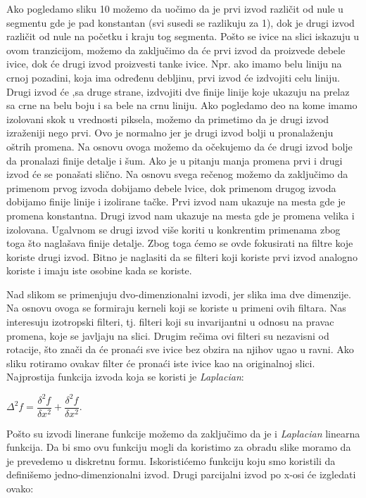 \documentclass[a4paper,12pt,titlepage]{article}
\begin{document}
Ako pogledamo sliku 10 možemo da uočimo da je prvi izvod različit od nule u segmentu gde je pad konstantan (svi susedi se razlikuju za 1), dok je drugi izvod različit od nule na početku i kraju tog segmenta. Pošto se ivice na slici iskazuju u ovom tranzicijom, možemo da zaključimo da će prvi izvod da proizvede debele ivice, dok će drugi izvod proizvesti tanke ivice. Npr. ako imamo belu liniju na crnoj pozadini, koja ima određenu debljinu, prvi izvod će izdvojiti celu liniju. Drugi izvod će ,sa druge strane, izdvojiti dve finije linije koje ukazuju na prelaz sa crne na belu boju i sa bele na crnu liniju. Ako pogledamo deo na kome imamo izolovani skok u vrednosti piksela, možemo da primetimo da je drugi izvod izraženiji nego prvi. Ovo je normalno jer je drugi izvod bolji u pronalaženju oštrih promena. Na osnovu ovoga možemo da očekujemo da će drugi izvod bolje da pronalazi finije detalje i šum. Ako je u pitanju manja promena prvi i drugi izvod će se ponašati slično. Na osnovu svega rečenog možemo da zaključimo da primenom prvog izvoda dobijamo debele lvice, dok primenom drugog izvoda dobijamo finije linije i izolirane tačke. Prvi izvod nam ukazuje na mesta gde je promena konstantna. Drugi izvod nam ukazuje na mesta gde je promena velika i izolovana. Ugalvnom se drugi izvod više koriti u konkrentim primenama zbog toga što naglašava finije detalje. Zbog toga ćemo se ovde fokusirati na filtre koje koriste drugi izvod. Bitno je naglasiti da se filteri koji koriste prvi izvod analogno koriste i imaju iste osobine kada se koriste.

Nad slikom se primenjuju dvo-dimenzionalni izvodi, jer slika ima dve dimenzije. Na osnovu ovoga se formiraju kerneli koji se koriste u primeni ovih filtara. Nas interesuju izotropski filteri, tj. filteri koji su invarijantni u odnosu na pravac promena, koje se javljaju na slici. Drugim rečima ovi filteri su nezavisni od rotacije, što znači da će pronaći sve ivice bez obzira na njihov ugao u ravni. Ako sliku rotiramo ovakav filter će pronaći iste ivice kao na originalnoj slici. Najprostija funkcija izvoda koja se koristi je \emph{Laplacian}: 

\begin{center}
$\Delta^{2}f = \dfrac{\delta^{2}f}{\delta x^{2}} + \dfrac{\delta^{2}f}{\delta x^{2}}$. \\
\end{center}

Pošto su izvodi linerane funkcije možemo da zaključimo da je i \emph{Laplacian} linearna funkcija. Da bi smo ovu funkciju mogli da koristimo za obradu slike moramo da je prevedemo u diskretnu formu. Iskoristićemo funkciju koju smo koristili da definišemo jedno-dimenzionalni izvod. Drugi parcijalni izvod po x-osi će izgledati ovako:
\end{document}
